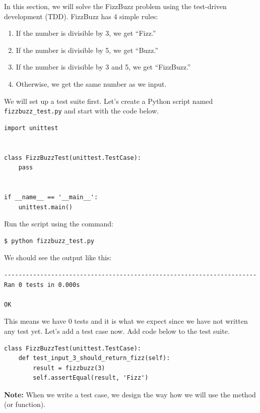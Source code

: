 \documentclass{article}
\begin{document}
\noindent In this section, we will solve the FizzBuzz problem using the
test-driven development (TDD). FizzBuzz has 4 simple rules:

\begin{enumerate}
  \item If the number is divisible by 3, we get ``Fizz.''
  \item If the number is divisible by 5, we get ``Buzz.''
  \item If the number is divisible by 3 and 5, we get ``FizzBuzz.''
  \item Otherwise, we get the same number as we input.
\end{enumerate}

\noindent We will set up a test suite first. Let's create a Python script named
{\tt fizzbuzz\_test.py} and start with the code below.

\begin{verbatim}
import unittest


class FizzBuzzTest(unittest.TestCase):
    pass


if __name__ == '__main__':
    unittest.main()
\end{verbatim}

\noindent Run the script using the command:

\begin{verbatim}
$ python fizzbuzz_test.py
\end{verbatim}

\noindent We should see the output like this:

\begin{verbatim}
----------------------------------------------------------------------
Ran 0 tests in 0.000s

OK
\end{verbatim}

\noindent This means we have 0 tests and it is what we expect since we have not
written any test yet. Let's add a test case now. Add code below to the test
suite.

\begin{verbatim}
class FizzBuzzTest(unittest.TestCase):
    def test_input_3_should_return_fizz(self):
        result = fizzbuzz(3)
        self.assertEqual(result, 'Fizz')
\end{verbatim}

\noindent \textbf{Note:} When we write a test case, we design the way how we
will use the method (or function). \\
\end{document}
